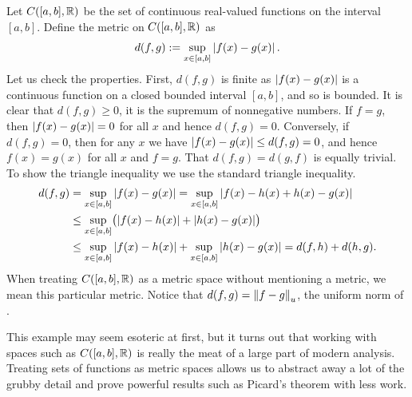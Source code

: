 \begin{example} \label{example:msC01}
Let $C([a,b],{\mathbb{R}})$ be the set of continuous real-valued functions on the
interval $[a,b]$.  Define the metric on $C([a,b],{\mathbb{R}})$ as
\begin{equation*}
d(f,g) := \sup_{x \in [a,b]} \left\lvert {f(x)-g(x)} \right\rvert .
\end{equation*}
Let us check the properties.  First, $d(f,g)$ is finite as
$\left\lvert {f(x)-g(x)} \right\rvert$ is a continuous function on a closed bounded interval
$[a,b]$, and so is bounded.
It is clear that $d(f,g) \geq 0$, 
it is the supremum of nonnegative numbers.  If $f = g$,
then $\left\lvert {f(x)-g(x)} \right\rvert = 0$ for all $x$ and hence $d(f,g) = 0$.  Conversely,
if $d(f,g) = 0$, then for any $x$ we have $\left\lvert {f(x)-g(x)} \right\rvert \leq d(f,g) = 0$,
and hence $f(x) = g(x)$ for all $x$ and $f=g$.  That $d(f,g) = d(g,f)$
is equally trivial.  To show the triangle inequality we use the standard
triangle inequality.
\begin{equation*}
\begin{split}
d(f,g) & =
\sup_{x \in [a,b]} \left\lvert {f(x)-g(x)} \right\rvert =
\sup_{x \in [a,b]} \left\lvert {f(x)-h(x)+h(x)-g(x)} \right\rvert
\\
& \leq
\sup_{x \in [a,b]} \bigl( \left\lvert {f(x)-h(x)} \right\rvert+\left\lvert {h(x)-g(x)} \right\rvert \bigr)
\\
& \leq
\sup_{x \in [a,b]} \left\lvert {f(x)-h(x)} \right\rvert+
\sup_{x \in [a,b]} \left\lvert {h(x)-g(x)} \right\rvert = d(f,h) + d(h,g) .
\end{split}
\end{equation*}
When treating $C([a,b],{\mathbb{R}})$ as a metric space without mentioning a metric, we mean this
particular metric.
Notice that $d(f,g) = \left\lVert {f-g} \right\rVert_u$, the uniform norm of .

This example may seem esoteric at first, but it turns out that working with
spaces such as $C([a,b],{\mathbb{R}})$ is really the meat of a large part of modern 
analysis.  Treating sets of functions as metric spaces allows us to
abstract away a lot of the grubby detail and prove powerful results such as
Picard's theorem with less work.
\end{example}

